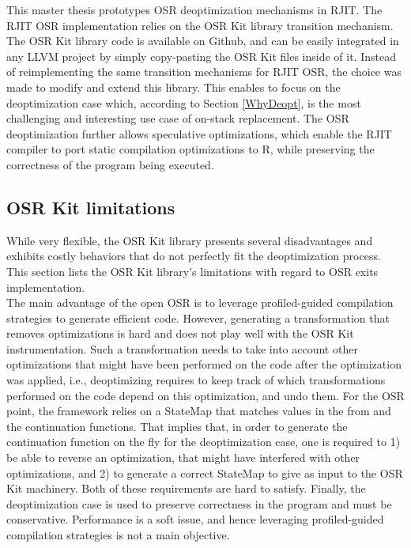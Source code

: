 This master thesis prototypes OSR deoptimization mechanisms in RJIT.
The RJIT OSR implementation relies on the OSR Kit\cite{OSRKit} library transition mechanism.
The OSR Kit library code is available on Github\cite{OSRKitGit}, and can be easily integrated in any LLVM project by simply copy-pasting the OSR Kit files inside of it.
Instead of reimplementing the same transition mechanisms for RJIT OSR, the choice was made to modify and extend this library.
This enables to focus on the deoptimization case which, according to Section \ref{WhyDeopt}, is the most challenging and interesting use case of on-stack replacement.
The OSR deoptimization further allows speculative optimizations, which enable the RJIT compiler to port static compilation optimizations to R, while preserving the correctness of the program being executed.\\

\subsection{OSR Kit limitations}\label{osrkitlimitations}

While very flexible, the OSR Kit\cite{OSRKit} library presents several disadvantages and exhibits costly behaviors that do not perfectly fit the deoptimization process.
This section lists the OSR Kit library's limitations with regard to OSR exits implementation.\\

The main advantage of the open OSR is to leverage profiled-guided compilation strategies to generate efficient code.
However, generating a transformation that removes optimizations is hard and does not play well with the OSR Kit instrumentation.
Such a transformation needs to take into account other optimizations that might have been performed on the code after the optimization was applied, i.e., deoptimizing requires to keep track of which transformations performed on the code depend on this optimization, and undo them.
For the OSR point, the framework relies on a StateMap that matches values in the from and the continuation functions.
That implies that, in order to generate the continuation function on the fly for the deoptimization case, one is required to 1) be able to reverse an optimization, that might have interfered with other optimizations, and 2) to generate a correct StateMap to give as input to the OSR Kit machinery.
Both of these requirements are hard to satisfy.
Finally, the deoptimization case is used to preserve correctness in the program and must be conservative. 
Performance is a soft issue, and hence leveraging profiled-guided compilation strategies is not a main objective. \\

